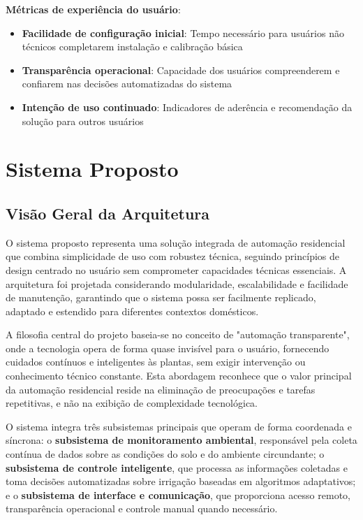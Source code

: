 \documentclass[twoside,english,brazilian]{UNISINOSmonografia}
\begin{document}
\textbf{Métricas de experiência do usuário}:
\begin{itemize}
\item \textbf{Facilidade de configuração inicial}: Tempo necessário para usuários não técnicos completarem instalação e calibração básica
\item \textbf{Transparência operacional}: Capacidade dos usuários compreenderem e confiarem nas decisões automatizadas do sistema
\item \textbf{Intenção de uso continuado}: Indicadores de aderência e recomendação da solução para outros usuários
\end{itemize}

\chapter{Sistema Proposto}

\section{Visão Geral da Arquitetura}

O sistema proposto representa uma solução integrada de automação residencial que combina simplicidade de uso com robustez técnica, seguindo princípios de design centrado no usuário sem comprometer capacidades técnicas essenciais. A arquitetura foi projetada considerando modularidade, escalabilidade e facilidade de manutenção, garantindo que o sistema possa ser facilmente replicado, adaptado e estendido para diferentes contextos domésticos.

A filosofia central do projeto baseia-se no conceito de "automação transparente", onde a tecnologia opera de forma quase invisível para o usuário, fornecendo cuidados contínuos e inteligentes às plantas, sem exigir intervenção ou conhecimento técnico constante. Esta abordagem reconhece que o valor principal da automação residencial reside na eliminação de preocupações e tarefas repetitivas, e não na exibição de complexidade tecnológica.

O sistema integra três subsistemas principais que operam de forma coordenada e síncrona: o \textbf{subsistema de monitoramento ambiental}, responsável pela coleta contínua de dados sobre as condições do solo e do ambiente circundante; o \textbf{subsistema de controle inteligente}, que processa as informações coletadas e toma decisões automatizadas sobre irrigação baseadas em algoritmos adaptativos; e o \textbf{subsistema de interface e comunicação}, que proporciona acesso remoto, transparência operacional e controle manual quando necessário.
\end{document}
